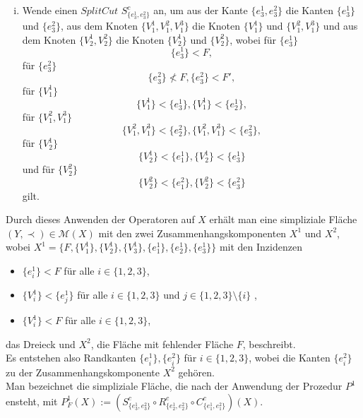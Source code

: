 \documentclass[12pt,titlepage]{article}
\begin{document}
\begin{enumerate}[(i)]
 \item Wende einen $Split Cut$ $ S^{c}_{\{e^1_{3},e^2_{3}\}}$ an, um aus der Kante $\{e^1_{3},e^2_{3}\}$ die Kanten $\{e^1_{3}\}$ und $\{e^2_{3}\}$, aus dem Knoten $\{V_1^1,V_1^2,V_1^3\}$ die Knoten $\{V_1^1\}$ und $\{V_1^2,V_1^3\}$ und aus dem Knoten $\{V_2^1,V_2^2\}$ die Knoten $\{V_2^1\}$ und $\{V_2^2\}$, wobei für $\{e_3^1\}$
\[
\{e_3^1\}<F,
\]
für $\{e_3^2\}$
\[
\{e_3^2\} \nless F,\{e_3^2\} < F',
\]
für $\{V_1^1\}$
\[
\{V_1^1\}<\{e_3^1\},\{V_1^1\}<\{e_2^1\},
\]
für $\{V_1^2,V_1^3\}$
\[
\{V_1^2,V_1^3\}<\{e_2^2\},\{V_1^2,V_1^3\}<\{e_3^2\},
\]
für $\{V_2^1\}$
\[
\{V_2^1\}<\{e_1^1\},\{V_2^1\}<\{e_3^1\}
\]
und für $\{V_2^2\}$
\[
\{V_2^2\}<\{e^2_1\},\{V_2^2\}<\{e_3^2\}
\] gilt.

\end{enumerate}
Durch dieses Anwenden der Operatoren auf $X$ erhält man eine simpliziale Fläche $(Y,\prec)\in \mathcal{M}(X)$ mit den zwei Zusammenhangskomponenten $X^{1}$ und $X^{2}$, wobei $X^{1}=\{F,\{V^1_{1}\},\{V^1_{2}\},\{V^1_{3}\},\{e^1_{1}\},\{e^1_{2}\},\{e^1_ {3}\}\}$ mit den Inzidenzen 
\begin{itemize}
 \item $\{e_{i}^1\} < F$ für alle $i \in \{1,2,3\}$,
 \item $\{V_{i}^1\}<\{e_{j}^1\}$ für alle $i \in \{1,2,3\}$ und $j \in \{1,2,3\} \setminus\{i\}$ ,
 \item $\{V_{i}^1\} < F$ für alle $i \in \{1,2,3\}$,
\end{itemize}
das Dreieck und $X^{2}$, die Fläche mit fehlender Fläche $F$, beschreibt.\\
Es entstehen also Randkanten $\{e^1_{i}\},\{e^2_{i}\}$ für $i \in \{1,2,3\}$, wobei die Kanten $\{e^2_{i}\}$ zu der Zusammenhangskomponente $X^2$ gehören. \\
Man bezeichnet die simpliziale Fläche, die nach der Anwendung der Prozedur $P^1$ ensteht, mit \emph{$P_F^1(X):=(S^c_{\{e_3^1,e_3^2\}}\circ R^c_{\{e_2^1,e_2^2\}}\circ C^c_{\{e_1^1,e_1^2\}})(X)$}.
\end{document}
